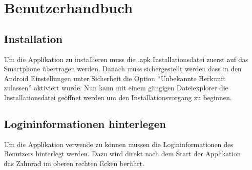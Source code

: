 \pagebreak
\section{Benutzerhandbuch}

\subsection{Installation}
Um die Applikation zu installieren muss die .apk Installationsdatei zuerst auf das Smartphone übertragen werden. Danach muss sichergestellt werden dass in den Android Einstellungen unter Sicherheit die Option \enquote{Unbekannte Herkunft zulassen} aktiviert wurde. Nun kann mit einem gängigen Dateiexplorer die Installationsdatei geöffnet werden um den Installationsvorgang zu beginnen.

\subsection{Logininformationen hinterlegen}

Um die Applikation verwende zu können müssen die Logininformationen des Benutzers hinterlegt werden. Dazu wird direkt nach dem Start der Applikation das Zahnrad im oberen rechten Ecken berührt.

